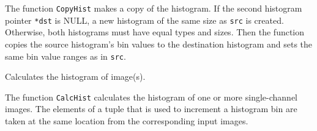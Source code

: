 The function \texttt{CopyHist} makes a copy of the histogram. If the
second histogram pointer \texttt{*dst} is NULL, a new histogram of the
same size as \texttt{src} is created. Otherwise, both histograms must
have equal types and sizes. Then the function copies the source histogram's
bin values to the destination histogram and sets the same bin value ranges
as in \texttt{src}.

\fi

\label{CalcHist}

Calculates the histogram of image(s).


\begin{description}
\end{description}

The function \texttt{CalcHist} calculates the histogram of one or more
single-channel images. The elements of a tuple that is used to increment
a histogram bin are taken at the same location from the corresponding
input images.

